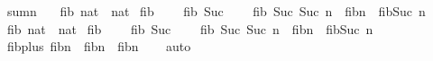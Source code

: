\begin{isabellebody}
\isanewline
{}\isamarkupfalse%
\ {\isachardoublequoteopen}sumn\ {\isacharparenleft}{}{\isacharhash}{}{\isacharhash}{}{\isacharhash}{\isacharbrackleft}{\isacharbrackright}{\isacharparenright}\ {}{\isachardoublequoteclose}\isanewline
\isanewline
{}\isamarkupfalse%
\ fib{\isacharcolon}{\isacharcolon}\ {\isachardoublequoteopen}nat\ {\isasymRightarrow}\ nat{\isachardoublequoteclose}\ \isanewline
{\isachardoublequoteopen}fib\ {}\ {\isacharequal}\ {}{\isachardoublequoteclose}\ {\isacharbar}\isanewline
{\isachardoublequoteopen}fib\ {\isacharparenleft}Suc\ {}{\isacharparenright}\ {\isacharequal}\ {}{\isachardoublequoteclose}\ {\isacharbar}\isanewline
{\isachardoublequoteopen}fib\ {\isacharparenleft}Suc\ {\isacharparenleft}Suc\ n{\isacharparenright}{\isacharparenright}\ {\isacharequal}\ fib{\isacharparenleft}n{\isacharparenright}\ {\isacharplus}\ fib{\isacharparenleft}Suc\ n{\isacharparenright}{\isachardoublequoteclose}\isanewline
\isanewline
\isanewline
{}\isamarkupfalse%
\ fib{}{\isacharcolon}{\isacharcolon}\ {\isachardoublequoteopen}nat\ {\isasymRightarrow}\ nat{\isachardoublequoteclose}\ \isanewline
{\isachardoublequoteopen}fib{}\ {}\ {\isacharequal}\ {}{\isachardoublequoteclose}\ {\isacharbar}\isanewline
{\isachardoublequoteopen}fib{}\ {\isacharparenleft}Suc\ {}{\isacharparenright}\ {\isacharequal}\ {}{\isachardoublequoteclose}\ {\isacharbar}\isanewline
{\isachardoublequoteopen}fib{}\ {\isacharparenleft}Suc\ {\isacharparenleft}Suc\ n{\isacharparenright}{\isacharparenright}\ {\isacharequal}\ fib{}{\isacharparenleft}n{\isacharparenright}\ {\isacharplus}\ fib{}{\isacharparenleft}Suc\ n{\isacharparenright}\ {\isacharplus}\ {}{\isachardoublequoteclose}\isanewline
\isanewline
{}\isamarkupfalse%
\ fib{\isacharunderscore}plus{\isacharunderscore}{}{\isacharcolon}\ {\isachardoublequoteopen}fib{\isacharparenleft}n{\isacharplus}{}{\isacharparenright}\ {\isacharequal}\ fib{\isacharparenleft}n{\isacharplus}{}{\isacharparenright}\ {\isacharplus}\ fib{\isacharparenleft}n{\isacharparenright}{\isachardoublequoteclose}\isanewline
%
\isadelimproof
\ \ %
\endisadelimproof
%
\isatagproof
{}\isamarkupfalse%
\ auto%
\endisatagproof
{\isafoldproof}%
%
\isadelimproof
\isanewline
%
\endisadelimproof
\isanewline
{}\isamarkupfalse%

\end{isabellebody}
